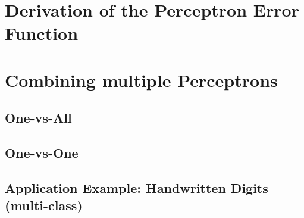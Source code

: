\section{Derivation of the Perceptron Error Function}

\section{Combining multiple Perceptrons}
\label{sec:combining_perceptrons}

\subsection{One-vs-All}
\subsection{One-vs-One}

\subsection{Application Example: Handwritten Digits (multi-class)}

\framedtext{\color{red}{TODO:}}

